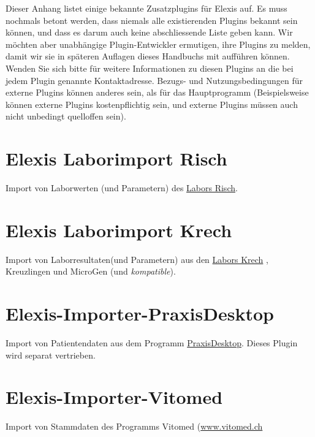 
Dieser Anhang listet einige bekannte Zusatzplugins für Elexis auf. Es muss nochmals betont werden, dass niemals alle existierenden Plugins bekannt sein können, und dass es darum auch keine abschliessende Liste geben kann. Wir möchten aber unabhängige Plugin-Entwickler ermutigen, ihre Plugins zu melden, damit wir sie in späteren Auflagen dieses Handbuchs mit aufführen können.
Wenden Sie sich bitte für weitere Informationen zu diesen Plugins an die bei jedem Plugin genannte Kontaktadresse. Bezugs- und Nutzungsbedingungen für externe Plugins können anderes sein, als für das Hauptprogramm (Beispielsweise können externe Plugins kostenpflichtig sein, und externe Plugins müssen auch nicht unbedingt quelloffen sein).


\section{Elexis Laborimport Risch}

Import von Laborwerten (und Parametern) des \href{http://www.risch.ch}{Labors Risch}.

\section{Elexis Laborimport Krech}

Import von Laborresultaten(und Parametern) aus den \href{http://www.labor.ch}{Labors Krech} , Kreuzlingen und MicroGen (und \textit{kompatible}).

\section{Elexis-Importer-PraxisDesktop}

Import von Patientendaten aus dem Programm \href{http://www.praxisdesktop.ch}{PraxisDesktop}. Dieses Plugin wird separat vertrieben.


 \section{Elexis-Importer-Vitomed}

 Import von Stammdaten des Programms Vitomed (\href{http://www.vitomed.ch}{www.vitomed.ch}


